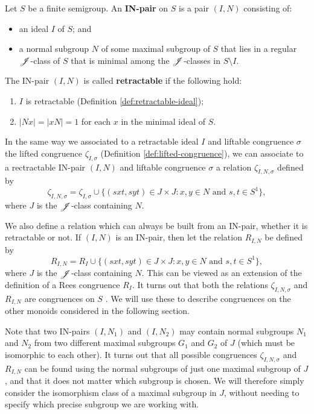 \begin{definition}
  \label{def:in-pair}
   Let $S$ be a finite semigroup.  An \textbf{IN-pair} on
  $S$ is a pair $(I,N)$ consisting of:
  \begin{itemize}
  \item an ideal $I$ of $S$; and
  \item a normal subgroup $N$ of some maximal subgroup of $S$ that lies in a
    regular $\mathrel{\mathscr{J}}$-class of $S$ that is minimal among the $\mathrel{\mathscr{J}}$-classes in
    $S \setminus I$.
  \end{itemize}
  The IN-pair $(I,N)$ is called \textbf{retractable} if the following hold:
  \begin{enumerate}[\rm(i)]
  \item $I$ is retractable (Definition \ref{def:retractable-ideal});
  \item $|Nx| = |xN| = 1$ for each $x$ in the minimal ideal of $S$.
  \end{enumerate}
\end{definition}

In the same way we associated to a retractable ideal $I$ and liftable congruence
$\sigma$ the lifted congruence $\zeta_{I,\sigma}$ (Definition
\ref{def:lifted-congruence}), we can associate to a rectractable IN-pair $(I,N)$
and liftable congruence $\sigma$ a relation $\zeta_{I,N,\sigma}$ defined by
$$\zeta_{I,N,\sigma} = \zeta_{I,\sigma} \cup
\{(sxt,syt) \in J \times J : x,y \in N \text{~and~} s,t \in S^1\},$$ where $J$
is the $\mathrel{\mathscr{J}}$-class containing $N$.

We also define a relation which can always be built from an IN-pair, whether it
is retractable or not.  If $(I,N)$ is an IN-pair, then let the relation
$R_{I,N}$ be defined by
$$R_{I,N} = R_I \cup
\{(sxt,syt) \in J \times J : x,y \in N \text{~and~} s,t \in S^1\},$$ where $J$
is the $\mathrel{\mathscr{J}}$-class containing $N$.  This can be viewed as an extension of the
definition of a Rees congruence $R_I$.
It turns out that both the relations
$\zeta_{I,N,\sigma}$ and $R_{I,N}$ are congruences on $S$ \cite[Proposition
3.22]{ourpaper}.  We will use these to describe congruences on the other monoids
considered in the following section.

Note that two IN-pairs $(I, N_1)$ and $(I, N_2)$ may contain normal subgroups
$N_1$ and $N_2$ from two different maximal subgroups $G_1$ and $G_2$ of $J$
(which must be isomorphic to each other).  It turns out that all possible
congruences $\zeta_{I,N,\sigma}$ and $R_{I,N}$ can be found using the normal
subgroups of just one maximal subgroup of $J$, and that it does not matter which
subgroup is chosen.  We will therefore simply consider the isomorphism class of
a maximal subgroup in $J$, without needing to specify which precise subgroup we
are working with.


